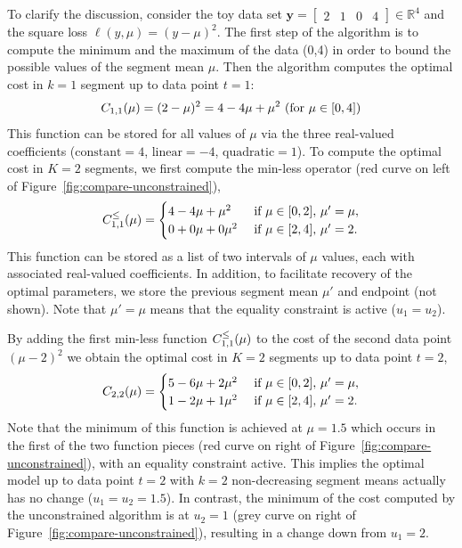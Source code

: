\documentclass{article}
\newcommand{\RR}{\mathbb R}
\begin{document}
To clarify the discussion, consider the 
toy data set $\mathbf y= \left[
\begin{array}{cccccc}
  2 & 1 & 0 & 4
\end{array}
\right] \in\RR^4$ and the square loss $\ell(y,\mu)=(y-\mu)^2$. The first
step of the algorithm is to compute the minimum and the maximum of the
data (0,4) in order to bound the possible values of the segment
mean $\mu$. Then the algorithm computes the optimal cost in $k=1$ segment up
to data point $t=1$:
\begin{equation}
  C_{1,1}(\mu) = (2-\mu)^2=4 - 4\mu + \mu^2\text{ (for $\mu\in[0,4]$)}
\end{equation}
This function can be stored for all values of $\mu$ via the three
real-valued coefficients ($\text{constant}=4$, $\text{linear}=-4$,
$\text{quadratic}=1$). To compute the optimal cost in $K=2$ segments,
we first compute the min-less operator (red curve on left of
Figure~\ref{fig:compare-unconstrained}),
\begin{equation}
  C_{1,1}^\leq(\mu) =
  \begin{cases}
    4 - 4\mu + \mu^2 &\text{ if }\mu\in[0,2],\, \mu'=\mu,\\
    0 + 0\mu + 0\mu^2 & \text{ if }\mu\in[2,4],\,  \mu'=2.
  \end{cases}
\end{equation}
This function can be stored as a list of two
intervals of $\mu$ values, each with associated real-valued
coefficients. In addition, to facilitate recovery of the optimal
parameters, we store the previous segment mean $\mu'$ and endpoint
(not shown). Note that $\mu'=\mu$ means that the equality constraint
is active ($u_1=u_2$).


By adding the first min-less function $C_{1,1}^\leq(\mu)$ to the
cost of the second data point $(\mu-2)^2$ we obtain the optimal cost in $K=2$
segments up to data point $t=2$,
\begin{equation}
  C_{2,2}(\mu) = 
  \begin{cases}
    5 - 6\mu + 2\mu^2 &\text{ if }\mu\in[0,2],\,  \mu'=\mu,\\
    1 - 2\mu + 1\mu^2 &\text{ if }\mu\in[2,4],\,  \mu'=2.
  \end{cases}
\end{equation}
Note that the minimum of this function is achieved at $\mu=1.5$ which
occurs in the first of the two function pieces (red curve on right of
Figure~\ref{fig:compare-unconstrained}), with an equality constraint
active. This implies the optimal model up to data point $t=2$ with
$k=2$ non-decreasing segment means actually has no change
($u_1=u_2=1.5$). In contrast, the minimum of the cost computed by the
unconstrained algorithm is at $u_2=1$ (grey curve on right of
Figure~\ref{fig:compare-unconstrained}), resulting in a change down
from $u_1=2$.
\end{document}
